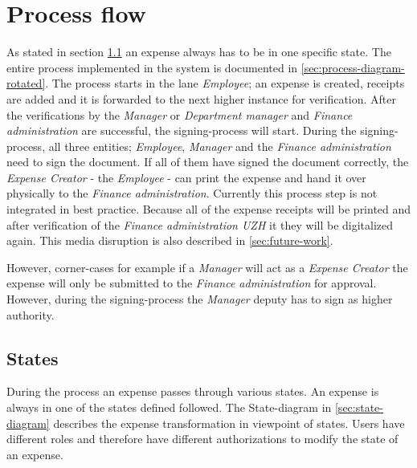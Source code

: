 \section{Process flow}
\label{sec:processflow}
As stated in section \ref{sec:states} an expense always has to be in one specific state. The entire process implemented in the system is documented in \ref{sec:process-diagram-rotated}.\newline
The process starts in the lane \textit{Employee}; an expense is created, receipts are added and it is forwarded to the next higher instance for verification. After the verifications by the \textit{Manager} or \textit{Department manager} and \textit{Finance administration} are successful, the signing-process will start. During the signing-process, all three entities; \textit{Employee}, \textit{Manager} and the \textit{Finance administration} need to sign the document. If all of them have signed the document correctly, the \textit{Expense Creator} - the \textit{Employee} - can print the expense and hand it over physically to the \textit{Finance administration}. Currently this process step is not integrated in best practice. Because all of the expense receipts will be printed and after verification of the \textit{Finance administration UZH} it they will be digitalized again. This media disruption is also described in \ref{sec:future-work}.\par
However, corner-cases for example if a \textit{Manager} will act as a \textit{Expense Creator} the expense will only be submitted to the \textit{Finance administration} for approval. However, during the signing-process the \textit{Manager} deputy has to sign as higher authority.

\subsection{States}
\label{sec:states}
During the process an expense passes through various states. An expense is always in one of the states defined followed. The State-diagram in \ref{sec:state-diagram} describes the expense transformation in viewpoint of states. Users have different roles and therefore have different authorizations to modify the state of an expense.

